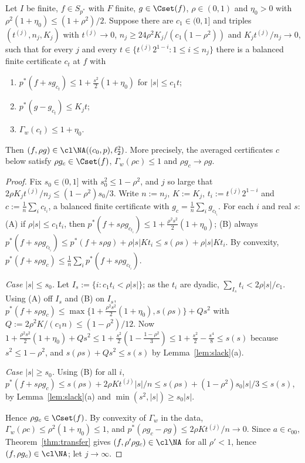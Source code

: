\begin{theorem}\label{thm:windowed}
Let $I$ be finite, $f\in S_{p^*}$ with $F$ finite, $g\in\Cset(f)$,
$\rho\in(0,1)$ and $\eta_0>0$ with $\rho^2(1+\eta_0)\le(1+\rho^2)/2$.
Suppose there are $c_1\in(0,1]$ and triples $(t^{(j)},n_j,K_j)$ with
$t^{(j)}\to0$, $n_j\ge24\rho^2K_j/(c_1(1-\rho^2))$ and
$K_jt^{(j)}/n_j\to0$, such that for every $j$ and every
$t\in\{t^{(j)}2^{1-i}:1\le i\le n_j\}$ there is a balanced finite
certificate $c_t$ at $f$ with
\begin{enumerate}
\item[(i)] $p^*(f+sg_{c_t})\le1+\frac{s^2}2(1+\eta_0)$ for $|s|\le c_1t$;
\item[(ii)] $p^*(g-g_{c_t})\le K_jt$;
\item[(iii)] $\Gamma_w(c_t)\le1+\eta_0$.
\end{enumerate}
Then $(f,\rho g)\in\cl\NA((c_0,p),\ell_2^2)$.  More precisely, the averaged
certificates $c$ below satisfy $\rho g_c\in\Cset(f)$, $\Gamma_w(\rho c)\le1$
and $\rho g_c\to\rho g$.
\end{theorem}

\begin{proof}
Fix $s_0\in(0,1]$ with $s_0^2\le1-\rho^2$, and $j$ so large that
$2\rho K_jt^{(j)}/n_j\le(1-\rho^2)s_0/3$.  Write $n:=n_j$, $K:=K_j$,
$t_i:=t^{(j)}2^{1-i}$ and $c:=\frac1n\sum_ic_{t_i}$, a balanced finite
certificate with $g_c=\frac1n\sum_ig_{c_{t_i}}$.  For each $i$ and real $s$:
(A) if $\rho|s|\le c_1t_i$, then $p^*(f+s\rho g_{c_{t_i}})\le1+
\frac{\rho^2s^2}2(1+\eta_0)$; (B) always $p^*(f+s\rho g_{c_{t_i}})\le
p^*(f+s\rho g)+\rho|s|Kt_i\le s(\rho s)+\rho|s|Kt_i$.  By convexity,
$p^*(f+s\rho g_c)\le\frac1n\sum_ip^*(f+s\rho g_{c_{t_i}})$.

\emph{Case $|s|\le s_0$.}  Let $I_s:=\{i:c_1t_i<\rho|s|\}$; as the $t_i$ are
dyadic, $\sum_{I_s}t_i<2\rho|s|/c_1$.  Using (A) off $I_s$ and (B) on $I_s$,
$p^*(f+s\rho g_c)\le\max\{1+\frac{\rho^2s^2}2(1+\eta_0),s(\rho s)\}+Qs^2$
with $Q:=2\rho^2K/(c_1n)\le(1-\rho^2)/12$.  Now
$1+\frac{\rho^2s^2}2(1+\eta_0)+Qs^2\le1+\frac{s^2}2(1-\frac{1-\rho^2}3)\le
1+\frac{s^2}2-\frac{s^4}8\le s(s)$ because $s^2\le1-\rho^2$, and
$s(\rho s)+Qs^2\le s(s)$ by Lemma~\ref{lem:slack}(a).

\emph{Case $|s|\ge s_0$.}  Using (B) for all $i$, $p^*(f+s\rho g_c)\le
s(\rho s)+2\rho Kt^{(j)}|s|/n\le s(\rho s)+(1-\rho^2)s_0|s|/3\le s(s)$, by
Lemma~\ref{lem:slack}(a) and $\min(s^2,|s|)\ge s_0|s|$.

Hence $\rho g_c\in\Cset(f)$.  By convexity of $\Gamma_w$ in the data,
$\Gamma_w(\rho c)\le\rho^2(1+\eta_0)\le1$, and $p^*(\rho g_c-\rho g)\le
2\rho Kt^{(j)}/n\to0$.  Since $a\in c_{00}$, Theorem~\ref{thm:transfer}
gives $(f,\rho'\rho g_c)\in\cl\NA$ for all $\rho'<1$, hence
$(f,\rho g_c)\in\cl\NA$; let $j\to\infty$.
\end{proof}

